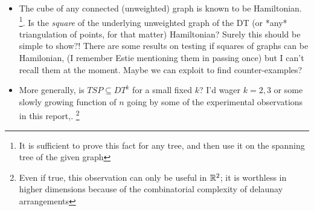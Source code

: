 \begin{appendices}
\begin{itemize}
     \begin{itemize}
       \item The cube of any connected (unweighted) graph is known to be Hamiltonian. \footnote{It is sufficient to prove this fact for any tree, and then use it on the spanning tree of the given graph}. 
             Is the \textit{square} of the underlying unweighted graph of the DT (or *any* triangulation of points, for that matter) Hamiltonian? 
             Surely this should be simple to show?! There are some results on testing if squares of graphs can be Hamilonian, (I remember Estie mentioning them in passing once) but 
             I can't recall them at the moment. Maybe we can exploit \cite{dillencourt1996finding} to find counter-examples?
        \item More generally, is $TSP \subseteq DT^{k}$ for a small fixed $k$? I'd wager $k=2,3$ or some slowly growing function of $n$ going by some of 
             the experimental observations in this report,. \footnote{Even if true, this observation can only be useful in $\mathbb{R}^2$; it is worthless in higher dimensions because of the combinatorial complexity of delaunay arrangements}
     \end{itemize}

 
\end{itemize}

\end{appendices}
